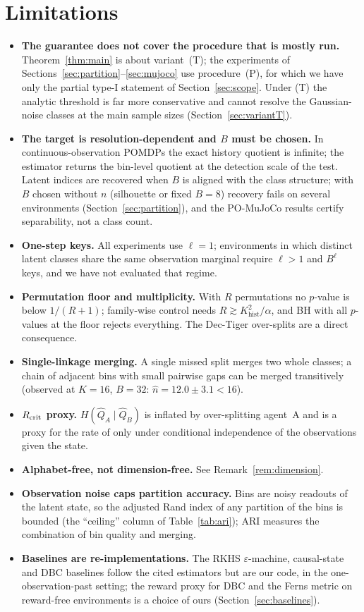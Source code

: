 \documentclass[10pt]{article}
\newcommand{\Khist}{K_{\mathrm{hist}}}
\begin{document}
\section{Limitations}
\label{sec:limitations}
\begin{itemize}
\item \textbf{The guarantee does not cover the procedure that is mostly run.}
  Theorem~\ref{thm:main} is about variant~(T); the experiments of
  Sections~\ref{sec:partition}--\ref{sec:mujoco} use procedure~(P), for which we
  have only the partial type-I statement of Section~\ref{sec:scope}.
  Under (T) the analytic threshold is far more conservative and cannot resolve
  the Gaussian-noise classes at the main sample sizes (Section~\ref{sec:variantT}).
\item \textbf{The target is resolution-dependent and $B$ must be chosen.}  In
  continuous-observation POMDPs the exact history quotient is infinite; the
  estimator returns the bin-level quotient at the detection scale of the test.
  Latent indices are recovered when $B$ is aligned with the class structure;
  with $B$ chosen without $n$ (silhouette or fixed $B=8$) recovery fails on
  several environments (Section~\ref{sec:partition}), and the PO-MuJoCo results
  certify separability, not a class count.
\item \textbf{One-step keys.}  All experiments use $\ell=1$; environments in
  which distinct latent classes share the same observation marginal require
  $\ell>1$ and $B^\ell$ keys, and we have not evaluated that regime.
\item \textbf{Permutation floor and multiplicity.}  With $R$ permutations no
  $p$-value is below $1/(R{+}1)$; family-wise control needs $R\gtrsim\Khist^2/\alpha$,
  and BH with all $p$-values at the floor rejects everything.  The Dec-Tiger
  over-splits are a direct consequence.
\item \textbf{Single-linkage merging.}  A single missed split merges two whole
  classes; a chain of adjacent bins with small pairwise gaps can be merged
  transitively (observed at $K=16$, $B=32$: $\hat n=12.0\pm3.1<16$).
\item \textbf{$R_{\rm crit}$ proxy.}  $H(\hat Q_A\mid\hat Q_B)$ is inflated by
  over-splitting agent~A and is a proxy for the rate of \citet{nixon2026rcrit}
  only under conditional independence of the observations given the state.
\item \textbf{Alphabet-free, not dimension-free.}  See Remark~\ref{rem:dimension}.
\item \textbf{Observation noise caps partition accuracy.}  Bins are noisy
  readouts of the latent state, so the adjusted Rand index of any partition of
  the bins is bounded (the ``ceiling'' column of Table~\ref{tab:ari}); ARI
  measures the combination of bin quality and merging.
\item \textbf{Baselines are re-implementations.}  The RKHS $\varepsilon$-machine,
  causal-state and DBC baselines follow the cited estimators but are our code, in
  the one-observation-past setting; the reward proxy for DBC and the Ferns metric
  on reward-free environments is a choice of ours (Section~\ref{sec:baselines}).
\end{itemize}
\end{document}
